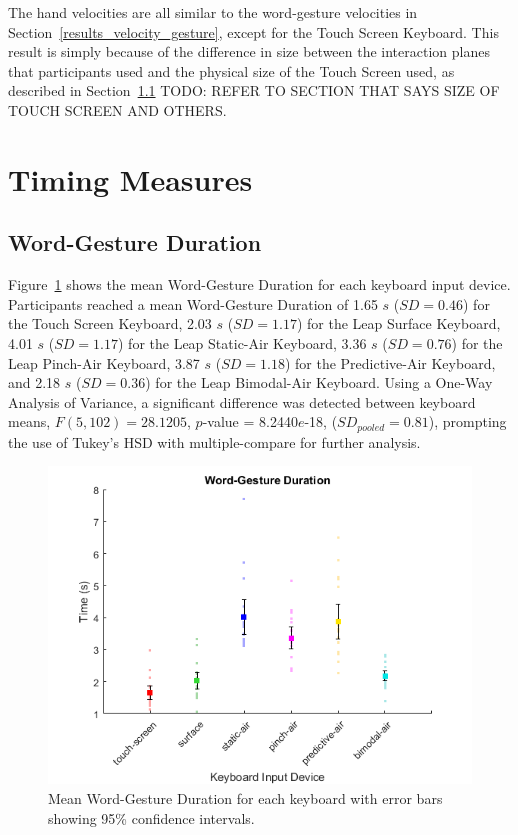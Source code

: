 The hand velocities are all similar to the word-gesture velocities in Section~\ref{results_velocity_gesture}, except for the Touch Screen Keyboard. This result is simply because of the difference in size between the interaction planes that participants used and the physical size of the Touch Screen used, as described in Section~\ref{} TODO: REFER TO SECTION THAT SAYS SIZE OF TOUCH SCREEN AND OTHERS.

\section{Timing Measures}

\subsection{Word-Gesture Duration}
Figure~\ref{fig_time_mean} shows the mean Word-Gesture Duration for each keyboard input device. Participants reached a mean Word-Gesture Duration of 1.65 $s$ ($SD = 0.46$) for the Touch Screen Keyboard, 2.03 $s$ ($SD = 1.17$) for the Leap Surface Keyboard, 4.01 $s$ ($SD = 1.17$) for the Leap Static-Air Keyboard, 3.36 $s$ ($SD = 0.76$) for the Leap Pinch-Air Keyboard, 3.87 $s$ ($SD = 1.18$) for the Predictive-Air Keyboard, and 2.18 $s$ ($SD = 0.36$) for the Leap Bimodal-Air Keyboard. Using a One-Way Analysis of Variance, a significant difference was detected between keyboard means, $F(5, 102) = 28.1205$, $p$-value = 8.2440$e$-18, ($SD_{pooled} = 0.81$), prompting the use of Tukey's HSD with multiple-compare for further analysis.

\begin{figure}[h]
	\centering
	\includegraphics{fig_time_mean}
	\caption[Mean Word-Gesture Duration]{Mean Word-Gesture Duration for each keyboard with error bars showing 95\% confidence intervals.}
	\label{fig_time_mean}
\end{figure}

